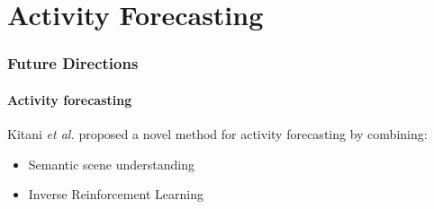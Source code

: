 \section{Activity Forecasting}

\begin{frame}
	\frametitle{Future Directions}
	\framesubtitle{Activity forecasting}
	
	\vspace{0.4cm}
	
	Kitani \emph{et al.} proposed a novel method for activity forecasting
	by combining:
	
	\begin{itemize}
		\item Semantic scene understanding
		\vspace{0.05cm}
		\item Inverse Reinforcement Learning
	\end{itemize}
	
	\begin{center}
	\end{center}
\end{frame}

